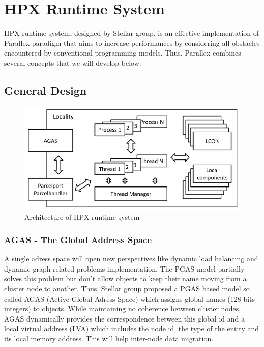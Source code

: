 \documentclass[conference]{acmsig-alternate-10pt}
\begin{document}
\section{HPX Runtime System}\label{HPX}
HPX runtime system, designed by Stellar group, is an effective implementation of Parallex paradigm that aims to increase performances by considering all obstacles encountered by conventional programming models. Thus, Parallex combines several concepts that we will develop below.

\subsection{General Design}

\begin{figure}[h]
\begin{center}
\includegraphics[scale=0.55]{Images/Im4.png}
\end{center}
\caption{Architecture of HPX runtime system}
\label{ArchiHPX}
\end{figure}

\subsubsection{AGAS - The Global Address Space}
A single adress space will open new perspectives like dynamic load balancing and dynamic graph related problems implementation. The PGAS model \cite{PGAS} partially solves this problem but don't allow objects to keep their name moving from a cluster node to another. Thus, Stellar group proposed a PGAS based model so called AGAS (Active Global Adress Space) \cite{Parallex} which assigns global names (128 bits integers) to objects. While maintaining no coherence between cluster nodes, AGAS dynamically provides the correspondence between this global id and a local virtual address (LVA) \cite{Parallex} which includes the node id, the type of the entity and its local memory address. This will help inter-node data migration.
\end{document}
